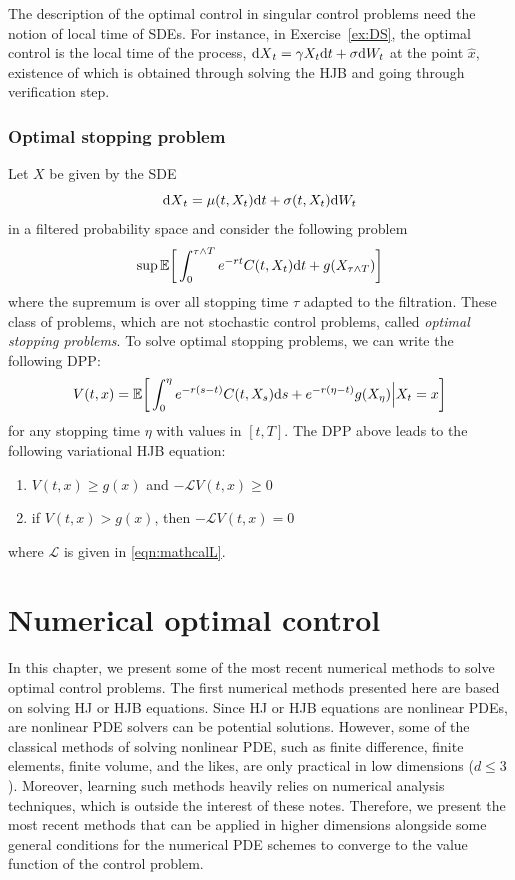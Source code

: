 \documentclass[11pt]{book}
\newcommand{\dt}{\text{\normalfont d}t}
\newcommand{\ds}{\text{\normalfont d}s}
\newcommand{\dX}{\text{\normalfont d}X}
\newcommand{\dW}{\text{\normalfont d}W}
\begin{document}
The description of the optimal control in singular control problems need the notion of local time of SDEs. For instance, in Exercise~\ref{ex:DS}, the optimal control is the local time of the process, ${\dX}_t=\gamma X_t{\dt}+\sigma \dW_t$ at the point $\hat{x}$, existence of which is obtained through solving the HJB and going through verification step. 
\subsection{Optimal stopping problem}
Let $X$ be given by the SDE
\begin{equation}
    {\dX}_t = \mu(t,X_t){\dt}+\sigma(t,X_t)\dW_t
\end{equation}
in a filtered probability space
and consider the following problem
\begin{equation}
    \sup_{}\mathbb{E}\bigg[\int_0^{\tau\wedge T} e^{-rt} C(t,X_t){\dt} + g(X_{\tau\wedge T})\bigg]
\end{equation}
where the supremum is over all stopping time $\tau$ adapted to the filtration. These class of problems, which are not stochastic control problems,  called \emph{optimal stopping problems}. To solve optimal stopping problems, we can write the following DPP:
\begin{equation}
    V(t,x)=\mathbb{E}\bigg[\int_0^{\eta}e^{-r(s-t)}C(t,X_s){\ds}+e^{-r(\eta-t)}g(X_\eta)\Big|X_t=x\bigg]
\end{equation}
for any stopping time $\eta$ with values in $[t,T]$. 
The DPP above leads to the following variational HJB equation:
\begin{enumerate}
    \item $V(t,x)\ge g(x)$ and $-\mathcal{L}V(t,x)\ge0$
    \item if $V(t,x)> g(x)$, then $-\mathcal{L}V(t,x)=0$
\end{enumerate}
where $\mathcal{L}$ is given in \eqref{eqn:mathcalL}.


\chapter{Numerical optimal control}
In this chapter, we present some of the most recent numerical methods to solve optimal control problems. The first numerical methods presented here are based on solving HJ or HJB equations. Since HJ or HJB equations are nonlinear PDEs, are nonlinear PDE solvers can be potential solutions. However, some of the classical methods  of solving nonlinear PDE, such as finite difference, finite elements, finite volume, and the likes, are only practical in low dimensions ($d\le3$). Moreover, learning such methods heavily relies on numerical analysis techniques, which is outside the interest of these notes. Therefore, we present the most recent methods that can be applied in higher dimensions alongside some general conditions for the numerical PDE schemes to converge to the value function of the control problem. 
\end{document}
